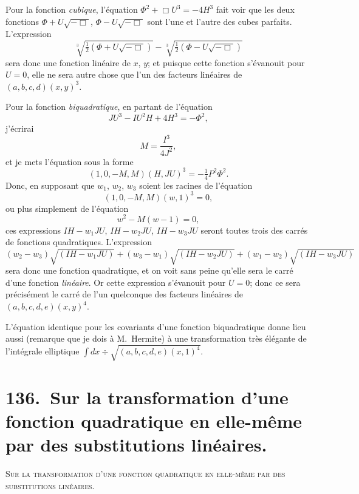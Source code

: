 \documentclass[11pt,a4paper]{article}
\begin{document}
\medskip

Pour la fonction \textit{cubique}, l'\'equation $\Phi^2 + \Box U^3 = -4 H^3$ fait voir que les deux fonctions $\Phi + U\sqrt{-\Box}$, $\Phi - U\sqrt{-\Box}$ sont l'une et l'autre des cubes parfaits. L'expression
\[
\sqrt[3]{\tfrac{1}{2}(\Phi + U\sqrt{-\Box})} - \sqrt[3]{\tfrac{1}{2}(\Phi - U\sqrt{-\Box})}
\]
sera donc une fonction lin\'eaire de $x$, $y$; et puisque cette fonction s'\'evanouit pour $U = 0$, elle ne sera autre chose que l'un des facteurs lin\'eaires de $(a,b,c,d)(x,y)^3$.

\medskip

Pour la fonction \textit{biquadratique}, en partant de l'\'equation
\[
JU^3 - IU^2 H + 4H^3 = -\Phi^2,
\]
j'\'ecrirai
\[
M = \frac{I^3}{4 J^2},
\]
et je mets l'\'equation sous la forme
\[
(1,0,-M,M)(H,JU)^3 = -\tfrac{1}{4} P^2 \Phi^2.
\]
Donc, en supposant que $w_1$, $w_2$, $w_3$ soient les racines de l'\'equation
\[
(1,0,-M,M)(w,1)^3 = 0,
\]
ou plus simplement de l'\'equation
\[
w^2 - M(w-1) = 0,
\]
ces expressions $IH - w_1 J U$, $IH - w_2 J U$, $IH - w_3 J U$ seront toutes trois des carr\'es de fonctions quadratiques. L'expression
\[
(w_2 - w_3)\sqrt{(IH - w_1 J U)} + (w_3 - w_1)\sqrt{(IH - w_2 J U)} + (w_1 - w_2)\sqrt{(IH - w_3 J U)}
\]
sera donc une fonction quadratique, et on voit sans peine qu'elle sera le carr\'e d'une fonction \textit{lin\'eaire}. Or cette expression s'\'evanouit pour $U = 0$; donc ce sera pr\'ecis\'ement le carr\'e de l'un quelconque des facteurs lin\'eaires de $(a,b,c,d,e)(x,y)^4$.

\medskip

L'\'equation identique pour les covariants d'une fonction biquadratique donne lieu aussi (remarque que je dois \`a M.~Hermite) \`a une transformation tr\`es \'el\'egante de l'int\'egrale elliptique $\int dx \div \sqrt{(a,b,c,d,e)(x,1)^4}$.

\section*{136.\ Sur la transformation d'une fonction quadratique en elle-m\^eme par des substitutions lin\'eaires.}

\begin{center}\textsc{Sur la transformation d'une fonction quadratique en elle-m\^eme par des substitutions lin\'eaires.}\end{center}
\end{document}
